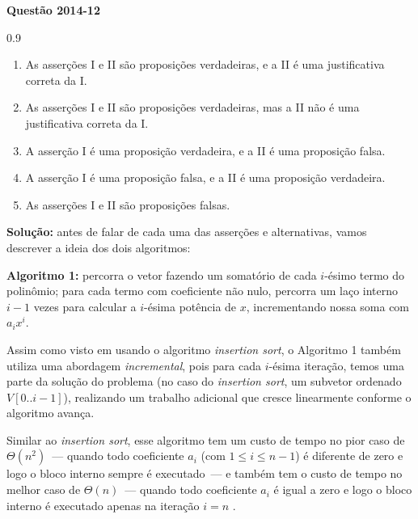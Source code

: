 \documentclass[12pt,a4paper]{article}
\newenvironment{question}[1]{%
    \pdfbookmark[2]{#1}{q:#1}
    \par\medskip\noindent
    \textbf{Questão #1} \dotfill
    \par\medskip\nopagebreak
}{%
    \medskip
}
\newenvironment{solution}{%
    \noindent
    \bgroup\textsl\bgroup\color[RGB]{20,70,40}
}{%
    \egroup\egroup
}
\begin{document}
\begin{question}{2014-12}
\begin{spacing}{0.9}
\begin{small}
\begin{enumerate}[label=\Alph*)]
    \item As asserções I e II são proposições verdadeiras, e a II é uma justificativa correta da I.
    \item As asserções I e II são proposições verdadeiras, mas a II não é uma justificativa correta da I.
    \item A asserção I é uma proposição verdadeira, e a II é uma proposição falsa.
    \item A asserção I é uma proposição falsa, e a II é uma proposição verdadeira.
    \item As asserções I e II são proposições falsas.
\end{enumerate}
\end{small}
\end{spacing}

\begin{solution}
\textbf{Solução:} antes de falar de cada uma das asserções e alternativas, vamos descrever a ideia dos dois algoritmos:

\textbf{Algoritmo 1:} percorra o vetor fazendo um somatório de cada $i$-ésimo termo do polinômio;
para cada termo com coeficiente não nulo, percorra um laço interno $i - 1$ vezes para calcular a $i$-ésima potência de $x$,
incrementando nossa soma com $a_ix^i$.

Assim como visto em \textcite[34]{clrs2022} usando o algoritmo \textit{insertion sort},
o Algoritmo 1 também utiliza uma abordagem \emph{incremental}, pois para cada $i$-ésima iteração,
temos uma parte da solução do problema (no caso do \textit{insertion sort}, um subvetor ordenado $V[0..i-1]$),
realizando um trabalho adicional que cresce linearmente conforme o algoritmo avança.

Similar ao \textit{insertion sort}, esse algoritmo tem um custo de tempo no pior caso de $\Theta(n^2)$~---
quando todo coeficiente $a_i$ (com $1 \le i \le n - 1$) é diferente de zero e logo o bloco interno sempre é executado~---
e também tem o custo de tempo no melhor caso de $\Theta(n)$~---
quando todo coeficiente $a_i$ é igual a zero e logo o bloco interno é executado apenas na iteração $i = n$ \parencite[33]{clrs2022}.


\end{solution}
\end{question}
\end{document}
